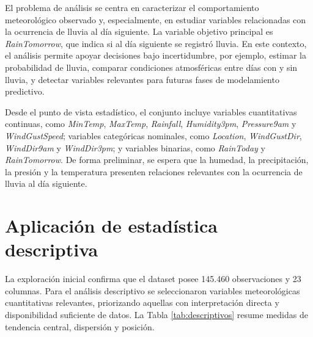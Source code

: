\documentclass[11pt,a4paper]{article}
\begin{document}
El problema de análisis se centra en caracterizar el comportamiento meteorológico observado y, especialmente, en estudiar variables relacionadas con la ocurrencia de lluvia al día siguiente. La variable objetivo principal es \textit{RainTomorrow}, que indica si al día siguiente se registró lluvia. En este contexto, el análisis permite apoyar decisiones bajo incertidumbre, por ejemplo, estimar la probabilidad de lluvia, comparar condiciones atmosféricas entre días con y sin lluvia, y detectar variables relevantes para futuras fases de modelamiento predictivo.

Desde el punto de vista estadístico, el conjunto incluye variables cuantitativas continuas, como \textit{MinTemp}, \textit{MaxTemp}, \textit{Rainfall}, \textit{Humidity3pm}, \textit{Pressure9am} y \textit{WindGustSpeed}; variables categóricas nominales, como \textit{Location}, \textit{WindGustDir}, \textit{WindDir9am} y \textit{WindDir3pm}; y variables binarias, como \textit{RainToday} y \textit{RainTomorrow}. De forma preliminar, se espera que la humedad, la precipitación, la presión y la temperatura presenten relaciones relevantes con la ocurrencia de lluvia al día siguiente.

\section{Aplicación de estadística descriptiva}

La exploración inicial confirma que el dataset posee 145.460 observaciones y 23 columnas. Para el análisis descriptivo se seleccionaron variables meteorológicas cuantitativas relevantes, priorizando aquellas con interpretación directa y disponibilidad suficiente de datos. La Tabla \ref{tab:descriptivos} resume medidas de tendencia central, dispersión y posición.
\end{document}
